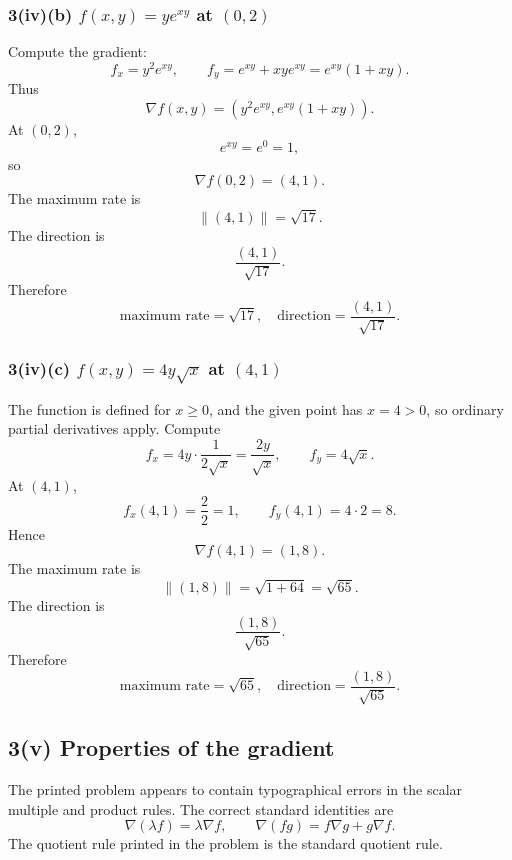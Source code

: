 \documentclass[11pt]{article}
\newcommand{\norm}[1]{\left\lVert #1\right\rVert}
\newcommand{\grad}{\nabla}
\begin{document}
\subsubsection*{3(iv)(b) $f(x,y)=ye^{xy}$ at $(0,2)$}
Compute the gradient:
\[
 f_x=y^2e^{xy},
 \qquad
 f_y=e^{xy}+xye^{xy}=e^{xy}(1+xy).
\]
Thus
\[
 \grad f(x,y)=\left(y^2e^{xy},e^{xy}(1+xy)\right).
\]
At $(0,2)$,
\[
 e^{xy}=e^0=1,
\]
so
\[
 \grad f(0,2)=(4,1).
\]
The maximum rate is
\[
 \norm{(4,1)}=\sqrt{17}.
\]
The direction is
\[
 \frac{(4,1)}{\sqrt{17}}.
\]
Therefore
\[
 \boxed{\text{maximum rate}=\sqrt{17},\quad \text{direction}=\frac{(4,1)}{\sqrt{17}}.}
\]

\subsubsection*{3(iv)(c) $f(x,y)=4y\sqrt{x}$ at $(4,1)$}
The function is defined for $x\geq 0$, and the given point has $x=4>0$, so ordinary partial derivatives apply. Compute
\[
 f_x=4y\cdot\frac1{2\sqrt{x}}=\frac{2y}{\sqrt{x}},
 \qquad
 f_y=4\sqrt{x}.
\]
At $(4,1)$,
\[
 f_x(4,1)=\frac{2}{2}=1,
 \qquad
 f_y(4,1)=4\cdot2=8.
\]
Hence
\[
 \grad f(4,1)=(1,8).
\]
The maximum rate is
\[
 \norm{(1,8)}=\sqrt{1+64}=\sqrt{65}.
\]
The direction is
\[
 \frac{(1,8)}{\sqrt{65}}.
\]
Therefore
\[
 \boxed{\text{maximum rate}=\sqrt{65},\quad \text{direction}=\frac{(1,8)}{\sqrt{65}}.}
\]

\begin{center}
\end{center}

\newpage
\subsection*{3(v) Properties of the gradient}

\begin{warningbox}
The printed problem appears to contain typographical errors in the scalar multiple and product rules.  The correct standard identities are
\[
 \grad(\lambda f)=\lambda\grad f,
 \qquad
 \grad(fg)=f\grad g+g\grad f.
\]
The quotient rule printed in the problem is the standard quotient rule.
\end{warningbox}
\end{document}
